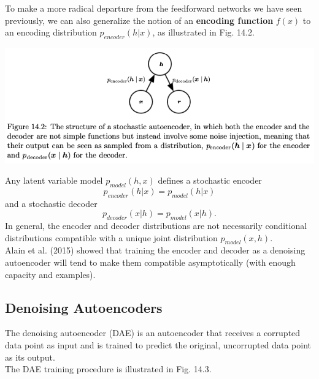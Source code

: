 \documentclass[11pt]{article}
\begin{document}
To make a more radical departure from the feedforward networks we have seen previously, we can also generalize the notion of an \textbf{encoding function} \(f(x)\) to an encoding distribution \(p_{encoder}(h | x)\), as illustrated in Fig. 14.2.\\

\begin{center}
\includegraphics[width=.9\linewidth]{pics/figure14.2-stochastic-autoencoder.png}
\end{center}


Any latent variable model \(p_{model}(h,x)\) defines a stochastic encoder\\
\begin{equation}
p_{encoder}(h|x) = p_{model}(h|x)
\end{equation}
and a stochastic decoder\\
\begin{equation}
p_{decoder}(x|h) = p_{model}(x|h).
\end{equation}
In general, the encoder and decoder distributions are not necessarily conditional distributions compatible with a unique joint distribution \(p_{model}(x, h)\).\\


Alain et al. (2015) showed that training the encoder and decoder as a denoising autoencoder will tend to make them compatible asymptotically (with enough capacity and examples).\\


\subsection{Denoising Autoencoders}
\label{sec:org3034bc8}
The denoising autoencoder (DAE) is an autoencoder that receives a corrupted data point as input and is trained to predict the original, uncorrupted data point as its output.\\

The DAE training procedure is illustrated in Fig. 14.3.\\
\end{document}
